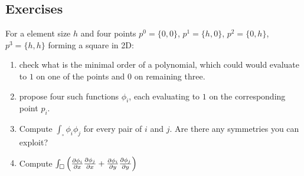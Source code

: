\documentclass[12pt,class=article,crop=false,preview=false]{standalone}
\begin{document}
\subsection*{Exercises}

\begin{exercise}
For a element size $h$ and four points $p^0=\{0,0\}$, $p^1=\{h,0\}$, $p^2=\{0,h\}$, $p^3=\{h,h\}$ forming a square in 2D:
\begin{enumerate}[label=\alph*)]
\item check what is the minimal order of a polynomial, which could would evaluate to $1$ on one of the points and $0$ on remaining three.
\item propose four such functions $\phi_i$, each evaluating to $1$ on the corresponding point $p_i$.
\item Compute $\int_\square\phi_i\phi_j$ for every pair of $i$ and $j$. Are there any symmetries you can exploit?
\item Compute $\int_\square \left(\frac{\partial \phi_i}{\partial x}\frac{\partial \phi_j}{\partial x} + \frac{\partial \phi_i}{\partial y}\frac{\partial \phi_j}{\partial y}\right)$
\end{enumerate}
\end{exercise}
\end{document}
